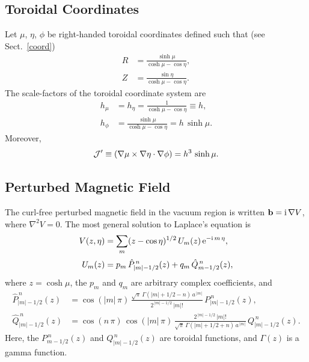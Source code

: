 \documentclass[12pt,prb,aps]{revtex4-1}
\begin{document}
\subsection{Toroidal Coordinates}
Let $\mu$, $\eta$, $\phi$ be right-handed toroidal coordinates defined such that (see Sect.~\ref{coord})
\begin{align}
R &= \frac{\sinh\mu}{\cosh\mu-\cos\eta},\\[0.5ex]
Z&=\frac{\sin\eta}{\cosh\mu-\cos\eta}.
\end{align}
The scale-factors of the toroidal coordinate system are
\begin{align}
h_\mu&=h_\eta= \frac{1}{\cosh\mu-\cos\eta}\equiv h,\\[0.5ex]
h_\phi &= \frac{\sinh\mu}{\cosh\mu-\cos\eta} = h\,\sinh\mu.
\end{align}
Moreover, 
\begin{equation}
{\cal J}' \equiv (\nabla\mu\times\nabla\eta\cdot\nabla\phi)= h^3\,\sinh\mu.
\end{equation}

\subsection{Perturbed Magnetic Field}
The curl-free perturbed magnetic field in the vacuum region is written ${\bf b} = {\rm i}\,\nabla V$,
where
$\nabla^2 V =0$.
The most general solution to Laplace's equation is
\begin{align}
V(z,\eta)&= \sum_m (z-\cos\eta)^{1/2}\,U_m(z)\,{\rm e}^{-{\rm i}\,m\,\eta}, \\[0.5ex]
U_m(z) &= p_m\,\hat{P}_{|m|-1/2}^{\,n}(z)+q_m\,\hat{Q}_{m-1/2}^{\,n}(z),
\end{align}
where  $z=\cosh\mu$, the $p_m$ and $q_m$ are arbitrary complex coefficients, and 
\begin{align}\label{e21}
\hat{P}_{|m|-1/2}^{\,n}(z) &= \cos(|m|\,\pi)\,\frac{\sqrt{\pi}\,\Gamma(|m|+1/2-n)\,a^{\,|m|}}{2^{\,|m|-1/2}\,|m|!}\,P_{|m|-1/2}^{\,n}(z),\\[0.5ex]
\hat{Q}_{|m|-1/2}^{\,n}(z)&= \cos(n\,\pi)\,\cos(|m|\,\pi)\,\frac{2^{\,|m|-1/2}\,|m|!}{\sqrt{\pi}\,\Gamma(|m|+1/2+n)\,a^{\,|m|}}\,Q_{|m|-1/2}^{\,n}(z).\label{e22}
\end{align}
Here,  the $P_{m-1/2}^{\,n}(z)$  and $Q_{|m|-1/2}^{\,n}(z)$ are toroidal functions,\cite{abrama}  and $\Gamma(z)$ is a
gamma function.\cite{abramb}
\end{document}
